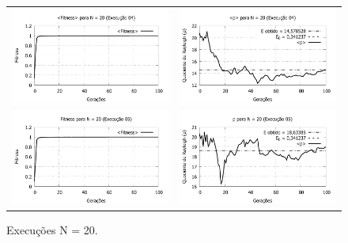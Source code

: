 \begin{figure}[phtb]
\begin{tabular}{@{}cc@{}}
		\includegraphics[width=.40\textwidth]{figs/resultados/fitnessGrad/N20_04_fitness.pdf} &
    \includegraphics[width=.40\textwidth]{figs/resultados/fitnessGrad/N20_04_rho.pdf}   \\
		\includegraphics[width=.40\textwidth]{figs/resultados/fitnessGrad/N20_05_fitness.pdf} &
    \includegraphics[width=.40\textwidth]{figs/resultados/fitnessGrad/N20_05_rho.pdf}
  \end{tabular}
  \caption{Execuções N = 20.}
	\label{fig:execucoes_N20}
\end{figure}

